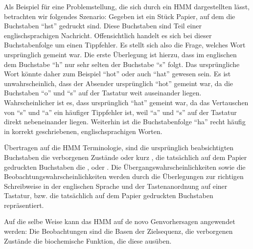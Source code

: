 Als Beispiel für eine Problemstellung, die sich durch ein HMM dargestellten
lässt, betrachten wir folgendes Szenario:
Gegeben ist ein Stück Papier, auf dem die Buchstaben \enquote{hst}
gedruckt sind.
Diese Buchstaben sind Teil einer englischsprachigen Nachricht.
Offensichtlich handelt es sich bei dieser Buchstabenfolge um einen Tippfehler.
Es stellt sich also die Frage, welches Wort ursprünglich gemeint war.
Die erste Überlegung ist hierzu, dass im englischen dem Buchstabe \enquote{h}
nur sehr selten der Buchstabe \enquote{s} folgt.
Das ursprüngliche Wort könnte daher zum Beispiel \enquote{hot} oder auch
\enquote{hat} gewesen sein.
Es ist unwahrscheinlich, dass der Absender ursprünglich \enquote{hot} gemeint
war, da die Buchstaben \enquote{o} und \enquote{s} auf der Tastatur weit
auseinander liegen.
Wahrscheinlicher ist es, dass ursprünglich \enquote{hat} gemeint war, da das
Vertauschen von \enquote{s} und \enquote{a} ein häufiger Tippfehler ist, weil
\enquote{a} und \enquote{s} auf der Tastatur direkt nebeneinander liegen.
Weiterhin ist die Buchstabenfolge \enquote{ha} recht häufig in korrekt
geschriebenen, englischsprachigen Worten.

Übertragen auf die HMM Terminologie, sind die ursprünglich beabsichtigten
Buchstaben die verborgenen Zustände oder kurz , die tatsächlich
auf dem Papier gedruckten Buchstaben die , oder
.
 Die Übergangswahrscheinlichkeiten sowie die Beobachtungswahrscheinlichkeiten
 werden durch die Überlegungen zur richtigen Schreibweise in der englischen
 Sprache und der Tastenanordnung auf einer Tastatur, bzw. die tatsächlich auf
 dem Papier gedruckten Buchstaben repräsentiert.

Auf die selbe Weise kann das HMM auf de novo  Genvorhersagen
angewendet werden:
Die Beobachtungen sind die Basen der Zielsequenz, die verborgenen Zustände die
biochemische Funktion, die diese ausüben.

